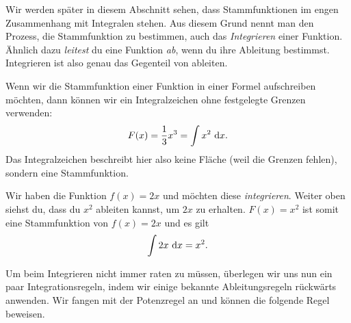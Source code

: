 \documentclass[../../main.tex]{subfiles}
\begin{document}
Wir werden später in diesem Abschnitt sehen, dass Stammfunktionen im engen Zusammenhang mit Integralen stehen. Aus diesem 
Grund nennt man den Prozess, die Stammfunktion zu bestimmen, auch das \emph{Integrieren} einer Funktion. Ähnlich dazu
\emph{leitest} du eine Funktion \emph{ab}, wenn du ihre Ableitung bestimmst. Integrieren ist also genau das 
Gegenteil von ableiten.
\begin{center}
\end{center}
Wenn wir die Stammfunktion einer Funktion in einer Formel aufschreiben möchten, dann können wir ein Integralzeichen ohne
festgelegte Grenzen verwenden:
\[F(x)=\frac{1}{3}x^3=\int x^2\mathop{}\mathrm{d} x.\]
Das Integralzeichen beschreibt hier also keine Fläche (weil die Grenzen fehlen), sondern eine Stammfunktion.
\begin{example}{}
    Wir haben die Funktion $f(x)=2x$ und möchten diese \emph{integrieren}. Weiter oben siehst du, dass du $x^2$ ableiten
    kannst, um $2x$ zu erhalten. $F(x)=x^2$ ist somit eine Stammfunktion von $f(x)=2x$ und es gilt
    \[\int 2x\mathop{}\mathrm{d} x=x^2.\]
\end{example}
Um beim Integrieren nicht immer raten zu müssen, überlegen wir uns nun ein paar Integrationsregeln, indem wir einige
bekannte Ableitungsregeln rückwärts anwenden. Wir fangen mit der Potenzregel an und können die folgende Regel beweisen.
\end{document}
